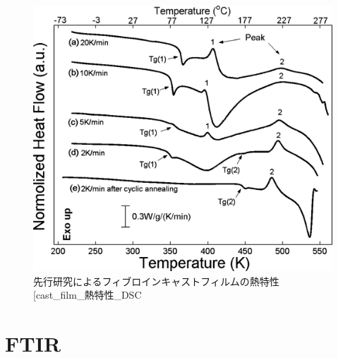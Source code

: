 \documentclass[dvipdfmx,12pt,a4paper]{jreport}
\makeatletter
\DeclareRobustCommand\cite{\unskip
    	\@ifnextchar[{\@tempswatrue\@citex}{\@tempswafalse\@citex[]}}
\makeatother
\begin{document}
	\begin{figure}[H]
		\centering
		\includegraphics[scale=1]{DSC_cast_film_report.jpeg}
		\caption{先行研究によるフィブロインキャストフィルムの熱特性\cite{cast_film_熱特性_DSC}}
		\label{cast_film_熱特性_DSC}
	\end{figure}

	\newpage
	\section{FTIR}
	\newpage
\end{document}
